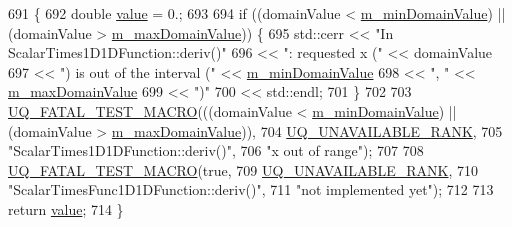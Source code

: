 \begin{DoxyCode}
691 \{
692   \textcolor{keywordtype}{double} \hyperlink{class_q_u_e_s_o_1_1_scalar_times_func1_d1_d_function_af3ff65dedf376a0acde1df1f70fdfd51}{value} = 0.;
693 
694   \textcolor{keywordflow}{if} ((domainValue < \hyperlink{class_q_u_e_s_o_1_1_base1_d1_d_function_a7b18b3854ee74ef5befbc67b75ebbdc5}{m\_minDomainValue}) || (domainValue > 
      \hyperlink{class_q_u_e_s_o_1_1_base1_d1_d_function_aa0025999ccab2145cd46c0a81e260e8f}{m\_maxDomainValue})) \{
695     std::cerr << \textcolor{stringliteral}{"In ScalarTimes1D1DFunction::deriv()"}
696               << \textcolor{stringliteral}{": requested x ("}            << domainValue
697               << \textcolor{stringliteral}{") is out of the interval ("} << \hyperlink{class_q_u_e_s_o_1_1_base1_d1_d_function_a7b18b3854ee74ef5befbc67b75ebbdc5}{m\_minDomainValue}
698               << \textcolor{stringliteral}{", "}                         << \hyperlink{class_q_u_e_s_o_1_1_base1_d1_d_function_aa0025999ccab2145cd46c0a81e260e8f}{m\_maxDomainValue}
699               << \textcolor{stringliteral}{")"}
700               << std::endl;
701   \}
702 
703   \hyperlink{_defines_8h_a56d63d18d0a6d45757de47fcc06f574d}{UQ\_FATAL\_TEST\_MACRO}(((domainValue < \hyperlink{class_q_u_e_s_o_1_1_base1_d1_d_function_a7b18b3854ee74ef5befbc67b75ebbdc5}{m\_minDomainValue}) || (domainValue 
      > \hyperlink{class_q_u_e_s_o_1_1_base1_d1_d_function_aa0025999ccab2145cd46c0a81e260e8f}{m\_maxDomainValue})),
704                       \hyperlink{namespace_q_u_e_s_o_a7d4679800a430ae8e473c1c7bc0bfb21}{UQ\_UNAVAILABLE\_RANK},
705                       \textcolor{stringliteral}{"ScalarTimes1D1DFunction::deriv()"},
706                       \textcolor{stringliteral}{"x out of range"});
707 
708   \hyperlink{_defines_8h_a56d63d18d0a6d45757de47fcc06f574d}{UQ\_FATAL\_TEST\_MACRO}(\textcolor{keyword}{true},
709                       \hyperlink{namespace_q_u_e_s_o_a7d4679800a430ae8e473c1c7bc0bfb21}{UQ\_UNAVAILABLE\_RANK},
710                       \textcolor{stringliteral}{"ScalarTimesFunc1D1DFunction::deriv()"},
711                       \textcolor{stringliteral}{"not implemented yet"});
712 
713   \textcolor{keywordflow}{return} \hyperlink{class_q_u_e_s_o_1_1_scalar_times_func1_d1_d_function_af3ff65dedf376a0acde1df1f70fdfd51}{value};
714 \}
\end{DoxyCode}
